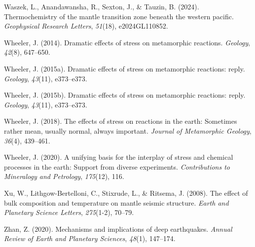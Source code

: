 \documentclass[draft,linenumbers]{agujournal2019}
\newlength{\cslhangindent}
\newenvironment{CSLReferences}[2]
 {\begin{list}{}{
  \setlength{\itemindent}{0pt}
  \setlength{\leftmargin}{0pt}
  \setlength{\parsep}{0pt}
  \ifodd #1
   \setlength{\leftmargin}{\cslhangindent}
   \setlength{\itemindent}{-\cslhangindent}
  \fi
  \setlength{\itemsep}{#2\baselineskip}
  }
  \item\relax}
 {\end{list}}
\begin{document}
\begin{CSLReferences}{1}{0}
Waszek, L., Anandawansha, R., Sexton, J., \& Tauzin, B. (2024).
Thermochemistry of the mantle transition zone beneath the western
pacific. \emph{Geophysical Research Letters}, \emph{51}(18),
e2024GL110852.

Wheeler, J. (2014). Dramatic effects of stress on metamorphic reactions.
\emph{Geology}, \emph{42}(8), 647--650.

Wheeler, J. (2015a). Dramatic effects of stress on metamorphic
reactions: reply. \emph{Geology}, \emph{43}(11), e373--e373.

Wheeler, J. (2015b). Dramatic effects of stress on metamorphic
reactions: reply. \emph{Geology}, \emph{43}(11), e373--e373.

Wheeler, J. (2018). The effects of stress on reactions in the earth:
Sometimes rather mean, usually normal, always important. \emph{Journal
of Metamorphic Geology}, \emph{36}(4), 439--461.

Wheeler, J. (2020). A unifying basis for the interplay of stress and
chemical processes in the earth: Support from diverse experiments.
\emph{Contributions to Mineralogy and Petrology}, \emph{175}(12), 116.

Xu, W., Lithgow-Bertelloni, C., Stixrude, L., \& Ritsema, J. (2008). The
effect of bulk composition and temperature on mantle seismic structure.
\emph{Earth and Planetary Science Letters}, \emph{275}(1-2), 70--79.

Zhan, Z. (2020). Mechanisms and implications of deep earthquakes.
\emph{Annual Review of Earth and Planetary Sciences}, \emph{48}(1),
147--174.

\end{CSLReferences}
\end{document}
